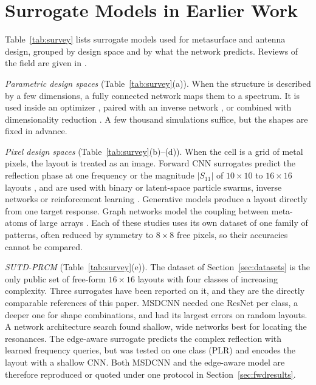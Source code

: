 \documentclass[journal]{IEEEtran}
\begin{document}
\section{Surrogate Models in Earlier Work}\label{sec:survey}
Table~\ref{tab:survey} lists surrogate models used for metasurface and antenna design, grouped by design space and by what the network predicts. Reviews of the field are given in \cite{khatib_review,yang_review,chen_gadreview}.

\emph{Parametric design spaces} (Table~\ref{tab:survey}(a)). When the structure is described by a few dimensions, a fully connected network maps them to a spectrum. It is used inside an optimizer \cite{yu_fss}, paired with an inverse network \cite{liu_tandem,niu_rcs}, or combined with dimensionality reduction \cite{kiarash_npj}. A few thousand simulations suffice, but the shapes are fixed in advance.

\emph{Pixel design spaces} (Table~\ref{tab:survey}(b)--(d)). When the cell is a grid of metal pixels, the layout is treated as an image. Forward CNN surrogates predict the reflection phase at one frequency \cite{zhu_phase} or the magnitude $|S_{11}|$ of $10\times10$ to $16\times16$ layouts \cite{zhang_vaepso,gupta_tandem,gupta_tl,chen_bpso}, and are used with binary or latent-space particle swarms, inverse networks or reinforcement learning \cite{aoun_thz}. Generative models \cite{tang_cvae,niu_diffusion,lyu_fss} produce a layout directly from one target response. Graph networks model the coupling between meta-atoms of large arrays \cite{khoram_gnn,bao_gatnet}. Each of these studies uses its own dataset of one family of patterns, often reduced by symmetry to $8\times8$ free pixels, so their accuracies cannot be compared.

\emph{SUTD-PRCM} (Table~\ref{tab:survey}(e)). The dataset of Section~\ref{sec:datasets} is the only public set of free-form $16\times16$ layouts with four classes of increasing complexity. Three surrogates have been reported on it, and they are the directly comparable references of this paper. MSDCNN \cite{msdcnn} needed one ResNet per class, a deeper one for shape combinations, and had its largest errors on random layouts. A network architecture search \cite{sutd,zhang_nas} found shallow, wide networks best for locating the resonances. The edge-aware surrogate \cite{edgeaware} predicts the complex reflection with learned frequency queries, but was tested on one class (PLR) and encodes the layout with a shallow CNN. Both MSDCNN and the edge-aware model are therefore reproduced or quoted under one protocol in Section~\ref{sec:fwdresults}.
\end{document}
